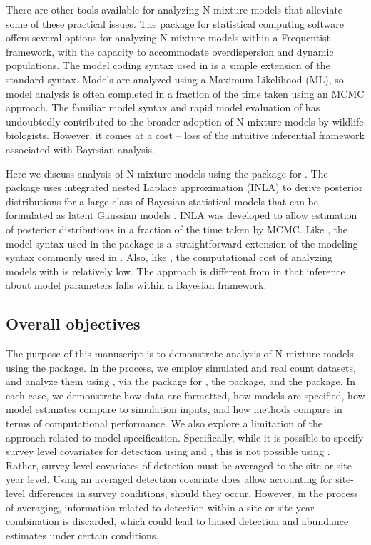 \documentclass[article]{jss}
\begin{document}
There are other tools available for analyzing N-mixture models that alleviate some of these practical issues.  The  package \citep{Fiske_Chandler_others_2011} for  statistical computing software \citep{R_Core_Team_2016} offers several options for analyzing N-mixture models within a Frequentist framework, with the capacity to accommodate overdispersion and dynamic populations. The model coding syntax used in  is a simple extension of the standard  syntax. Models are analyzed using a Maximum Likelihood (ML), so model analysis is often completed in a fraction of the time taken using an MCMC approach. The familiar model syntax and rapid model evaluation of  has undoubtedly contributed to the broader adoption of N-mixture models by wildlife biologists. However, it comes at a cost -- loss of the intuitive inferential framework associated with Bayesian analysis.

Here we discuss analysis of N-mixture models using the  package \citep{Rue_Martino_Lindgren_Simpson_Riebler_2013} for . The  package uses integrated nested Laplace approximation (INLA) to derive posterior distributions for a large class of Bayesian statistical models that can be formulated as latent Gaussian models \citep{Rue_Martino_Chopin_2009}. INLA was developed to allow estimation of posterior distributions in a fraction of the time taken by MCMC. Like , the model syntax used in the  package is a straightforward extension of the modeling syntax commonly used in . Also, like , the computational cost of analyzing models with  is relatively low. The  approach is different from  in that inference about model parameters falls within a Bayesian framework.

\subsection[Overall objectives]{Overall objectives}
The purpose of this manuscript is to demonstrate analysis of N-mixture models using the  package. In the process, we employ simulated and real count datasets, and analyze them using , via the  package \citep{Denwood_2016} for , the  package, and the  package. In each case, we demonstrate how data are formatted, how models are specified, how model estimates compare to simulation inputs, and how methods compare in terms of computational performance. We also explore a limitation of the  approach related to model specification. Specifically, while it is possible to specify survey level covariates for detection using  and , this is not possible using . Rather, survey level covariates of detection must be averaged to the site or site-year level. Using an averaged detection covariate does allow accounting for site-level differences in survey conditions, should they occur. However, in the process of averaging, information related to detection within a site or site-year combination is discarded, which could lead to biased detection and abundance estimates under certain conditions.
\end{document}
